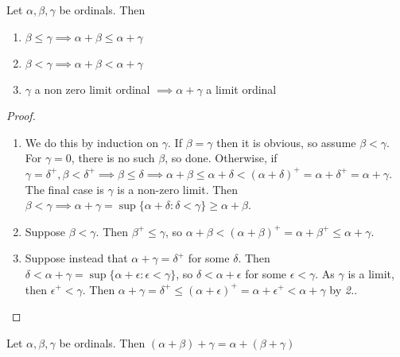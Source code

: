 \documentclass[10pt,a4paper]{article}
\begin{document}
\begin{lemma}
Let $\alpha, \beta, \gamma$ be ordinals. Then
\begin{enumerate}
\item $\beta \leq \gamma \implies \alpha + \beta \leq \alpha+\gamma$
\item $\beta < \gamma \implies \alpha + \beta < \alpha + \gamma$
\item $\gamma$ a non zero limit ordinal $\implies \alpha+\gamma$ a limit ordinal
\end{enumerate}
\end{lemma}
\begin{proof}
\item
\begin{enumerate}
\item We do this by induction on $\gamma$. If $\beta = \gamma$ then it is obvious, so assume $\beta < \gamma$. For $\gamma = 0$, there is no such $\beta$, so done. Otherwise, if $\gamma=  \delta^+, \beta < \delta^+ \implies \beta \leq \delta \implies \alpha + \beta \leq \alpha + \delta < (\alpha + \delta)^+ = \alpha + \delta^+ = \alpha+\gamma$. The final case is $\gamma$ is a non-zero limit. Then $\beta < \gamma \implies \alpha+\gamma = \sup\{\alpha + \delta : \delta < \gamma\} \geq \alpha+\beta$.

\item Suppose $\beta < \gamma$. Then $\beta^+ \leq \gamma$, so $\alpha + \beta < (\alpha + \beta)^+ = \alpha +\beta^+ \leq \alpha +\gamma$.

\item Suppose instead that $\alpha + \gamma = \delta^+$ for some $\delta$. Then $\delta < \alpha + \gamma = \sup\{\alpha + \epsilon : \epsilon < \gamma\}$, so $\delta < \alpha + \epsilon$ for some $\epsilon < \gamma$. As $\gamma$ is a limit, then $\epsilon^{+} < \gamma$. Then $\alpha + \gamma = \delta^+ \leq (\alpha + \epsilon)^+ = \alpha + \epsilon^+ < \alpha + \gamma$ by \textit{2.}. \contr
\end{enumerate}
\end{proof}
\begin{proposition}
Let $\alpha, \beta, \gamma$ be ordinals. Then $(\alpha+\beta)+\gamma = \alpha + (\beta + \gamma)$
\end{proposition}
\end{document}
